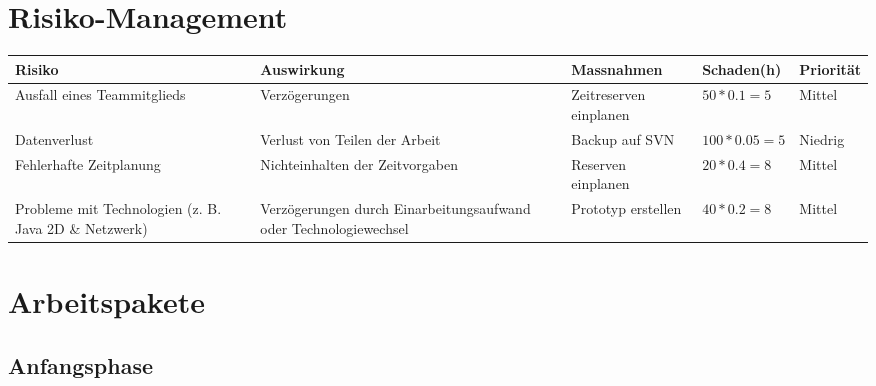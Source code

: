 \documentclass[a4paper,12pt,halfparskip,DIV14]{scrartcl}
\begin{document}
\section{Risiko-Management}

\begin{tabular}{@{} p{2.7cm} p{3.6cm} p{4cm} l l @{}}
\toprule
\textbf{Risiko} &
\textbf{Auswirkung} &
\textbf{Massnahmen} &
\textbf{Schaden\footnotemark (h)} &
\textbf{Priorität} \\
\midrule
Ausfall eines Teammitglieds & Verzögerungen & Zeitreserven einplanen  & $50 * 0.1 = 5$ & Mittel \\
\midrule
Datenverlust & Verlust von Teilen der Arbeit & Backup auf SVN & $100 * 0.05 = 5$ & Niedrig \\
\midrule
Fehlerhafte Zeitplanung & Nichteinhalten der Zeitvorgaben & Reserven einplanen & $20 * 0.4 = 8$ & Mittel \\
\midrule
Probleme mit Technologien (z. B. Java 2D \&  Netzwerk) & Verzögerungen durch Einarbeitungsaufwand oder Technologiewechsel & Prototyp erstellen & $40 * 0.2 = 8$ & Mittel \\
\bottomrule
\end{tabular}


\section{Arbeitspakete}

\subsection{Anfangsphase}
\end{document}
